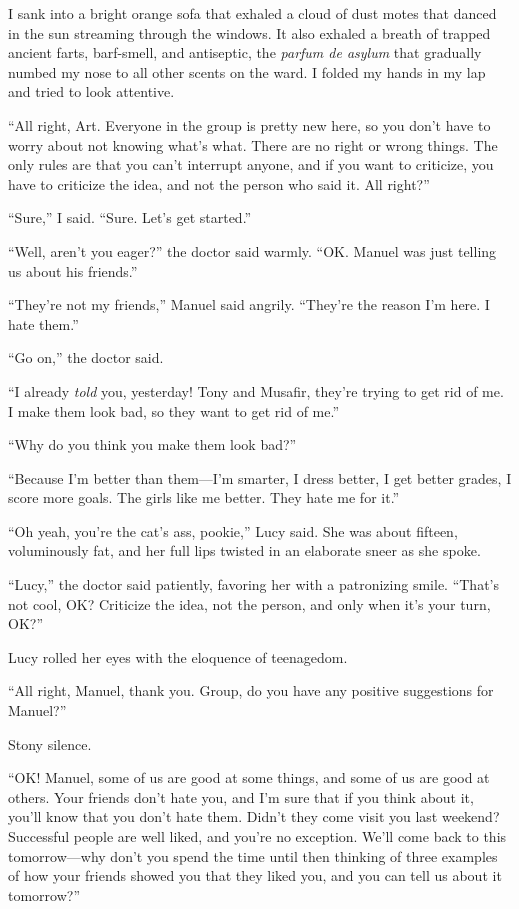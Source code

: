 I sank into a bright orange sofa that exhaled a cloud of dust motes
that danced in the sun streaming through the windows. It also
exhaled a breath of trapped ancient farts, barf-smell, and
antiseptic, the \emph{parfum de asylum} that gradually numbed my
nose to all other scents on the ward. I folded my hands in my lap
and tried to look attentive.

“All right, Art. Everyone in the group is pretty new here, so you
don’t have to worry about not knowing what’s what. There are no
right or wrong things. The only rules are that you can’t interrupt
anyone, and if you want to criticize, you have to criticize the
idea, and not the person who said it. All right?”

“Sure,” I said. “Sure. Let’s get started.”

“Well, aren’t you eager?” the doctor said warmly. “OK. Manuel was
just telling us about his friends.”

“They’re not my friends,” Manuel said angrily. “They’re the reason
I’m here. I hate them.”

“Go on,” the doctor said.

“I already \emph{told} you, yesterday! Tony and Musafir, they’re
trying to get rid of me. I make them look bad, so they want to get
rid of me.”

“Why do you think you make them look bad?”

“Because I’m better than them—I’m smarter, I dress better, I get
better grades, I score more goals. The girls like me better. They
hate me for it.”

“Oh yeah, you’re the cat’s ass, pookie,” Lucy said. She was about
fifteen, voluminously fat, and her full lips twisted in an
elaborate sneer as she spoke.

“Lucy,” the doctor said patiently, favoring her with a patronizing
smile. “That’s not cool, OK? Criticize the idea, not the person,
and only when it’s your turn, OK?”

Lucy rolled her eyes with the eloquence of teenagedom.

“All right, Manuel, thank you. Group, do you have any positive
suggestions for Manuel?”

Stony silence.

“OK! Manuel, some of us are good at some things, and some of us are
good at others. Your friends don’t hate you, and I’m sure that if
you think about it, you’ll know that you don’t hate them. Didn’t
they come visit you last weekend? Successful people are well liked,
and you’re no exception. We’ll come back to this tomorrow—why don’t
you spend the time until then thinking of three examples of how
your friends showed you that they liked you, and you can tell us
about it tomorrow?”

